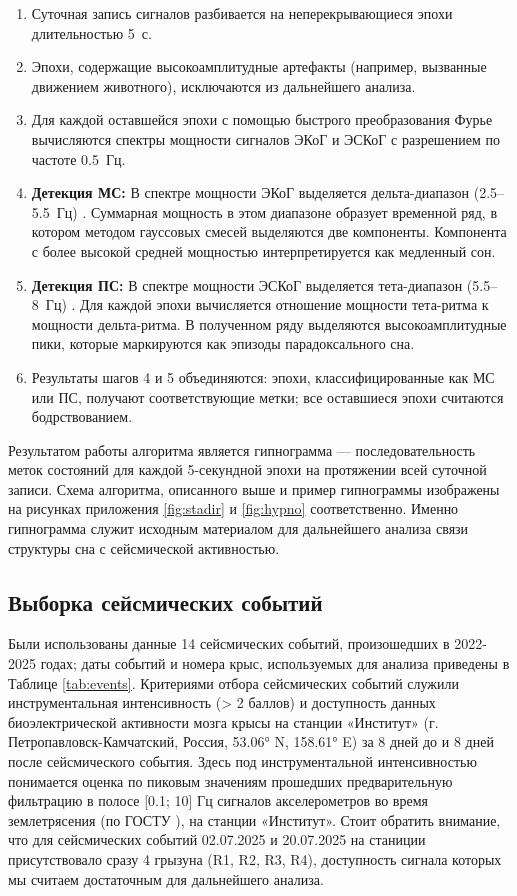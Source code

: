 \documentclass[14pt]{mmcs_article}
\begin{document}
\begin{enumerate}
	\item Суточная запись сигналов разбивается на неперекрывающиеся эпохи длительностью 5~с.
	\item Эпохи, содержащие высокоамплитудные артефакты (например, вызванные движением животного), исключаются из дальнейшего анализа.
	\item Для каждой оставшейся эпохи с помощью быстрого преобразования Фурье вычисляются спектры мощности сигналов ЭКоГ и ЭСКоГ с разрешением по частоте 0.5~Гц.
	\item \textbf{Детекция МС:} В спектре мощности ЭКоГ выделяется дельта-диапазон (2.5--5.5~Гц) \cite{Fang2010}. Суммарная мощность в этом диапазоне образует временной ряд, в котором методом гауссовых смесей выделяются две компоненты. Компонента с более высокой средней мощностью интерпретируется как медленный сон.
	\item \textbf{Детекция ПС:} В спектре мощности ЭСКоГ выделяется тета-диапазон (5.5--8~Гц) \cite{Vyazovskiy2005}. Для каждой эпохи вычисляется отношение мощности тета-ритма к мощности дельта-ритма. В полученном ряду выделяются высокоамплитудные пики, которые маркируются как эпизоды парадоксального сна.
	\item Результаты шагов 4 и 5 объединяются: эпохи, классифицированные как МС или ПС, получают соответствующие метки; все оставшиеся эпохи считаются бодрствованием.
\end{enumerate}

Результатом работы алгоритма является гипнограмма --- последовательность меток состояний для каждой 5-секундной эпохи на протяжении всей суточной записи. Схема алгоритма, описанного выше и пример гипнограммы изображены на рисунках приложения \ref{fig:stadir} и \ref{fig:hypno} соответственно. Именно гипнограмма служит исходным материалом для дальнейшего анализа связи структуры сна с сейсмической активностью.

\subsection*{Выборка сейсмических событий}
Были использованы данные 14 сейсмических событий, произошедших в 2022-2025 годах; даты событий и номера крыс, используемых для анализа приведены в Таблице \ref{tab:events}. Критериями отбора сейсмических событий служили инструментальная интенсивность (> 2 баллов) и доступность данных биоэлектрической активности мозга крысы на станции «Институт» (г. Петропавловск-Камчатский, Россия, 53.06° N, 158.61° E) за 8 дней до и 8 дней после сейсмического события. Здесь под инструментальной интенсивностью понимается оценка по пиковым значениям прошедших предварительную фильтрацию в полосе [0.1; 10] Гц сигналов акселерометров во время землетрясения (по ГОСТУ \cite{GOST2017}), на станции «Институт». Стоит обратить внимание, что для сейсмических событий 02.07.2025 и 20.07.2025 на станиции присутствовало сразу 4 грызуна (R1, R2, R3, R4), доступность сигнала которых мы считаем достаточным для дальнейшего анализа.
\end{document}
